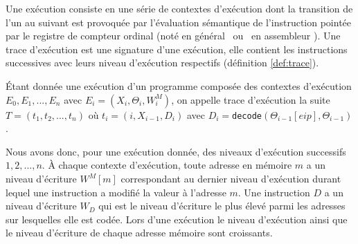 Une exécution consiste en une série de contextes d'exécution dont la transition de l'un au suivant est provoquée par l'évaluation sémantique de l'instruction pointée par le registre de compteur ordinal (noté en général \pc\ ou \eip\ en assembleur \xq). Une trace d'exécution est une signature d'une exécution, elle contient les instructions successives avec leurs niveau d'exécution respectifs (définition \ref{def:trace}).

\begin{defi}
Étant donnée une exécution d'un programme composée des contextes d'exécution $E_0, E_1, ..., E_n$ avec $E_i=(X_i, \Theta_i, W_i^M)$, on appelle trace d'exécution la suite $T=(t_1, t_2, ..., t_n)$ où $t_i=(i, X_{i-1}, D_i)$ avec $D_i=$\texttt{decode}$(\Theta_{i-1}[eip], \Theta_{i-1})$.
\label{def:trace}
\end{defi}

Nous avons donc, pour une exécution donnée, des niveaux d'exécution successifs $1, 2, ..., n$.
À chaque contexte d'exécution, toute adresse en mémoire $m$ a un niveau d'écriture $W^M[m]$ correspondant au dernier niveau d'exécution durant lequel une instruction a modifié la valeur à l'adresse $m$.
Une instruction $D$ a un niveau d'écriture $W_D$ qui est le niveau d'écriture le plus élevé parmi les adresses sur lesquelles elle est codée.
Lors d'une exécution le niveau d'exécution ainsi que le niveau d'écriture de chaque adresse mémoire sont croissants.








